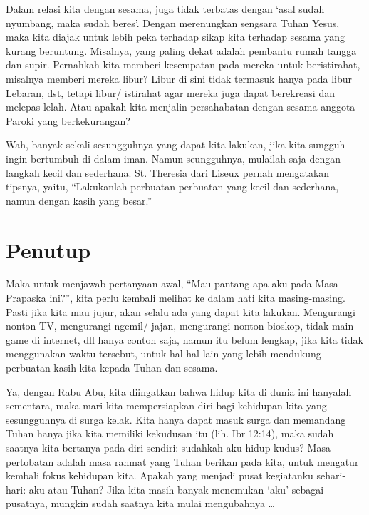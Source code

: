 Dalam relasi kita dengan sesama, juga tidak terbatas dengan `asal sudah nyumbang, maka sudah beres'. Dengan merenungkan sengsara Tuhan Yesus, maka kita diajak untuk lebih peka terhadap sikap kita terhadap sesama yang kurang beruntung. Misalnya, yang paling dekat adalah pembantu rumah tangga dan supir. Pernahkah kita memberi kesempatan pada mereka untuk beristirahat, misalnya memberi mereka libur? Libur di sini tidak termasuk hanya pada libur Lebaran, dst, tetapi libur/ istirahat agar mereka juga dapat berekreasi dan melepas lelah. Atau apakah kita menjalin persahabatan dengan sesama anggota Paroki yang berkekurangan?

Wah, banyak sekali sesungguhnya yang dapat kita lakukan, jika kita sungguh ingin bertumbuh di dalam iman. Namun seungguhnya, mulailah saja dengan langkah kecil dan sederhana. St. Theresia dari Liseux pernah mengatakan tipsnya, yaitu, ``Lakukanlah perbuatan-perbuatan yang kecil dan sederhana, namun dengan kasih yang besar.''

\section*{Penutup}

Maka untuk menjawab pertanyaan awal, ``Mau pantang apa aku pada Masa Prapaska ini?'', kita perlu kembali melihat ke dalam hati kita masing-masing. Pasti jika kita mau jujur, akan selalu ada yang dapat kita lakukan. Mengurangi nonton TV, mengurangi ngemil/ jajan, mengurangi nonton bioskop, tidak main game di internet, dll hanya contoh saja, namun itu belum lengkap, jika kita tidak menggunakan waktu tersebut, untuk hal-hal lain yang lebih mendukung perbuatan kasih kita kepada Tuhan dan sesama.

Ya, dengan Rabu Abu, kita diingatkan bahwa hidup kita di dunia ini hanyalah sementara, maka mari kita mempersiapkan diri bagi kehidupan kita yang sesungguhnya di surga kelak. Kita hanya dapat masuk surga dan memandang Tuhan hanya jika kita memiliki kekudusan itu (lih. Ibr 12:14), maka sudah saatnya kita bertanya pada diri sendiri: sudahkah aku hidup kudus? Masa pertobatan adalah masa rahmat yang Tuhan berikan pada kita, untuk mengatur kembali fokus kehidupan kita. Apakah yang menjadi pusat kegiatanku sehari-hari: aku atau Tuhan? Jika kita masih banyak menemukan `aku' sebagai pusatnya, mungkin sudah saatnya kita mulai mengubahnya \ldots

